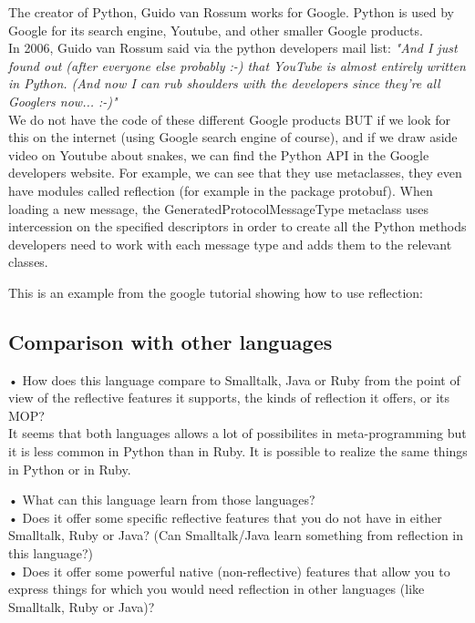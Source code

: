 The creator of Python, Guido van Rossum works for Google. Python is used by Google for its search engine, Youtube, and other smaller Google products.\\

In 2006, Guido van Rossum said via the python developers mail list:
\emph{"And I just found out (after everyone else probably :-) that YouTube is almost entirely written in Python. (And now I can rub shoulders with the developers since they're all Googlers now... :-)"}\\

We do not have the code of these different Google products BUT if we look for this on the internet (using Google search engine of course), and if we draw aside video on Youtube about snakes, we can find the Python API in the Google developers website. For example, we can see that they use metaclasses, they even have modules called reflection (for example in the package protobuf). When loading a new message, the GeneratedProtocolMessageType metaclass uses intercession on the specified descriptors in order to create all the Python methods developers need to work with each message type and adds them to the relevant classes. \cite{google_reflection_references, google_reflection_tutorial}

This is an example from the google tutorial showing how to use reflection:



\subsection{Comparison with other languages}
•	How does this language compare to Smalltalk, Java or Ruby from the point of view of the reflective features it supports, the kinds of reflection it offers, or its MOP?\\
It seems that both languages allows a lot of possibilites in meta-programming but it is less common in Python than in Ruby. It is possible to realize the same things in Python or in Ruby.

•	What can this language learn from those languages?\\
•	Does it offer some specific reflective features that you do not have in either Smalltalk, Ruby or Java? (Can Smalltalk/Java learn something from reflection in this language?)\\
•	Does it offer some powerful native (non-reflective) features that allow you to express things for which you would need reflection in other languages (like Smalltalk, Ruby or Java)?\\
